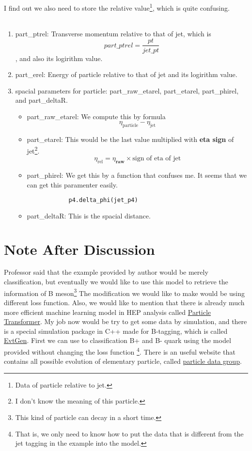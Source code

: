 \documentclass[12pt]{article}
\numberwithin{equation}{section}
\begin{document}
I find out we also need to store the relative value\footnote{Data of particle relative to jet.}, which is quite confusing. 
\\\\
\begin{enumerate}
    \item part\_ptrel: Transverse momentum relative to that of jet, which is $$part\_ptrel = \frac{pt}{jet\_pt}$$, and also its logirithm value.
    \item part\_erel:  Energy of particle relative to that of jet and its logirithm value.
    \item spacial parameters for particle: part\_raw\_etarel, part\_etarel, part\_phirel, and part\_deltaR.
    \begin{itemize}
        \item part\_raw\_etarel: We compute this by formula$$\eta_{\text{particle}} - \eta_{\text{jet}}$$
        \item part\_etarel: This would be the last value multiplied with \textbf{eta sign} of jet\footnote{I don't know the meaning of this particle.}.$$\eta_{\text{rel}} = \eta_{\textbf{raw}}\times\text{sign of eta of jet}$$
        \item part\_phirel: We get this by a function that confuses me. It seems that we can get this paramenter easily.
        \begin{center}
        \begin{lstlisting}
            p4.delta_phi(jet_p4)
        \end{lstlisting}
    \end{center}
        \item part\_deltaR: This is the spacial distance.
    \end{itemize}
\end{enumerate}

\section{Note After Discussion}

Professor said that the example provided by author would be merely classification, but eventually we would like to use this model to retrieve the information of B meson\footnote{This kind of particle can decay in a short time.}
The modification we would like to make would be using different loss function. 
Also, we would like to mention that there is already much more efficient machine learning model in HEP analysis called \href{https://github.com/jet-universe/particle_transformer}{Particle Transformer}.
My job now would be try to get some data by simulation, and there is a special simulation package in C++ made for B-tagging, which is called \href{https://evtgen.hepforge.org/}{EvtGen}.
First we can use to classification B+ and B- quark using the model provided without changing the loss function
\footnote{That is, we only need to know how to put the data that is different from the jet tagging in the example into the model.}.
There is an useful website that contains all possible evolution of elementary particle, called \href{https://pdglive.lbl.gov/Viewer.action}{particle data group}.
\end{document}

